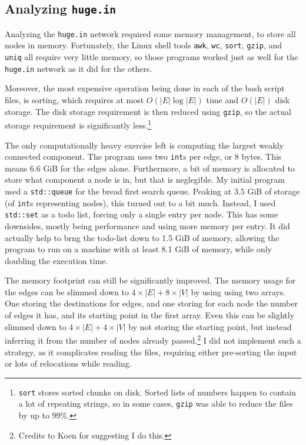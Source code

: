 \documentclass[12pt,a4paper,hidelinks]{article}
\begin{document}
\subsection{Analyzing \texttt{huge.in}}

Analyzing the \texttt{huge.in} network required some memory management, to store all nodes in memory. Fortunately, the Linux shell tools \texttt{awk}, \texttt{wc}, \texttt{sort}, \texttt{gzip}, and \texttt{uniq} all require very little memory, so those programs worked just as well for the \texttt{huge.in} network as it did for the others.

Moreover, the most expensive operation being done in each of the bash script files, is sorting, which requires at most $O(|E| \log |E|)$ time and $O(|E|)$ disk storage. The disk storage requirement is then reduced using \texttt{gzip}, so the actual storage requirement is significantly less.\footnote{\texttt{sort} stores sorted chunks on disk. Sorted lists of numbers happen to contain a lot of repeating strings, so in some cases, \texttt{gzip} was able to reduce the files by up to 99\%.}

The only computationally heavy exercise left is computing the largest weakly connected component. The program uses two \texttt{int}s per edge, or 8 bytes. This means 6.6 GiB for the edges alone. Furthermore, a bit of memory is allocated to store what component a node is in, but that is neglegible. My initial program used a \texttt{std::queue} for the bread first search queue. Peaking at 3.5 GiB of storage (of \texttt{int}s representing nodes), this turned out to a bit much. Instead, I used \texttt{std::set} as a todo list, forcing only a single entry per node. This has some downsides, mostly being performance and using more memory per entry. It did actually help to brng the todo-list down to 1.5 GiB of memory, allowing the program to run on a machine with at least 8.1 GiB of memory, while only doubling the execution time.

The memory footprint can still be significantly improved. The memory usage for the edges can be slimmed down to $4 \times |E| + 8 \times |V|$ by using using two arrays. One storing the destinations for edges, and one storing for each node the number of edges it has, and its starting point in the first array. Even this can be slightly slimmed down to $4 \times |E| + 4 \times |V|$ by not storing the starting point, but instead inferring it from the number of nodes already passed.\footnote{Credits to Koen \textellipsis for suggesting I do this.} I did not implement such a strategy, as it complicates reading the files, requiring either pre-sorting the input or lots of relocations while reading.
\end{document}
